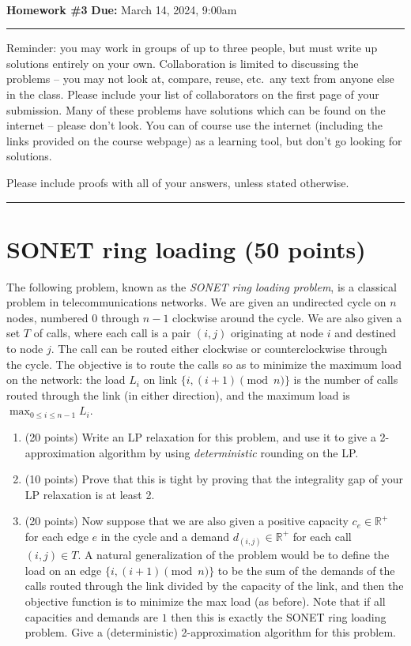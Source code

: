 \documentclass[11pt]{article}
\newcommand{\R}{\ensuremath{\mathbb R}}
\begin{document}
\\
{{\bf Homework \#3}} \hfill {{\bf Due:} March 14, 2024, 9:00am} \\
\rule[0.1in]{\textwidth}{0.4pt}

Reminder: you may work in groups of up to three people, but must write up solutions entirely on your own.  Collaboration is limited to discussing the problems -- you may not look at, compare, reuse, etc.~any text from anyone else in the class.  Please include your list of collaborators on the first page of your submission.  Many of these problems have solutions which can be found on the internet -- please don't look.  You can of course use the internet (including the links provided on the course webpage) as a learning tool, but don't go looking for solutions.  

Please include proofs with all of your answers, unless stated otherwise.

\noindent \rule[0.1in]{\textwidth}{0.4pt}

\section{SONET ring loading (50 points)}
The following problem, known as the \emph{SONET ring loading problem}, is a classical problem in telecommunications networks.  We are given an undirected cycle on $n$ nodes, numbered $0$ through $n-1$ clockwise around the cycle.  We are also given a set $T$ of calls, where each call is a pair $(i,j)$ originating at node $i$ and destined to node $j$.  The call can be routed either clockwise or counterclockwise through the cycle.  The objective is to route the calls so as to minimize the maximum load on the network: the load $L_i$ on link $\{i, (i+1)\pmod n\}$ is the number of calls routed through the link (in either direction), and the maximum load is $\max_{0 \leq i \leq n-1} L_i$.  

\begin{enumerate}
\item (20 points) Write an LP relaxation for this problem, and use it to give a 2-approximation algorithm by using \emph{deterministic} rounding on the LP.

\item (10 points) Prove that this is tight by proving that the integrality gap of your LP relaxation is at least 2.

\item (20 points) Now suppose that we are also given a positive capacity $c_e \in \R^+$ for each edge $e$ in the cycle and a demand $d_{(i,j)} \in \R^+$ for each call $(i,j) \in T$.  A natural generalization of the problem would be to define the load on an edge $\{i, (i+1)\pmod n\}$ to be the sum of the demands of the calls routed through the link divided by the capacity of the link, and then the objective function is to minimize the max load (as before).  Note that if all capacities and demands are $1$ then this is exactly the SONET ring loading problem.  Give a (deterministic) 2-approximation algorithm for this problem.  
\end{enumerate}
\end{document}
